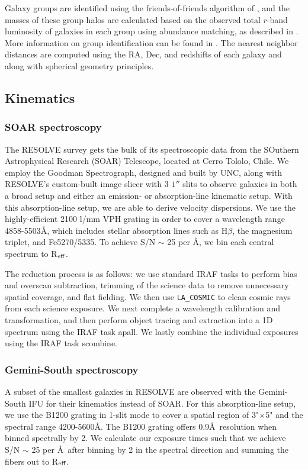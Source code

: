 \documentclass[iop,apj]{emulateapj}
\newcommand{\Reff}{R$_{\rm eff}$}
\begin{document}
Galaxy groups are identified using the friends-of-friends algorithm of \citet{Berlind2006}, and the masses of these group halos are calculated based on the observed total $r$-band luminosity of galaxies in each group using abundance matching, as described in \citet{Blanton2007}. More information on group identification can be found in \citet{Moffett2015}. The nearest neighbor distances are computed using the RA, Dec, and redshifts of each galaxy and along with spherical geometry principles. 

\subsection{Kinematics}
\label{kindata}

\subsubsection{SOAR spectroscopy}
\noindent The RESOLVE survey gets the bulk of its spectroscopic data from the SOuthern Astrophysical Research (SOAR) Telescope, located at Cerro Tololo, Chile. We employ the Goodman Spectrograph, designed and built by UNC, along with RESOLVE's custom-built image slicer with 3 $1''$ slits to observe galaxies in both a broad setup and either an emission- or absorption-line kinematic setup. With this absorption-line setup, we are able to derive velocity dispersions. We use the highly-efficient 2100 l/mm VPH grating in order to cover a wavelength range 4858-5503\AA, which includes stellar absorption lines such as H$\beta$, the magnesium triplet, and Fe5270/5335. To achieve S/N $\sim$ 25 per \AA, we bin each central spectrum to \Reff.

The reduction process is as follows: we use standard IRAF tasks to perform bias and overscan subtraction, trimming of the science data to remove unnecessary spatial coverage, and flat fielding. We then use \texttt{LA\_COSMIC} \citep{vanDokkum2001} to clean cosmic rays from each science exposure. We next complete a wavelength calibration and transformation, and then perform object tracing and extraction into a 1D spectrum using the IRAF task apall. We lastly combine the individual exposures using the IRAF task scombine.

\subsubsection{Gemini-South spectroscopy}

\noindent A subset of the smallest galaxies in RESOLVE are observed with the Gemini-South IFU for their kinematics instead of SOAR. For this absorption-line setup, we use the B1200 grating in 1-slit mode to cover a spatial region of 3"$\times$5" and the spectral range 4200-5600\AA. The B1200 grating offers 0.9\AA\ resolution when binned spectrally by 2. We calculate our exposure times such that we achieve S/N $\sim$ 25 per \AA\, after binning by 2 in the spectral direction and summing the fibers out to \Reff.
\end{document}

